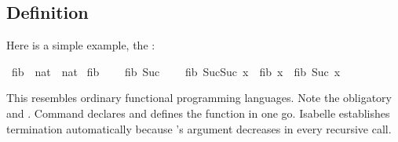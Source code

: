 %
\begin{isabellebody}%
\def\isabellecontext{fun{\isadigit{0}}}%
%
\isadelimtheory
%
\endisadelimtheory
%
\isatagtheory
%
\endisatagtheory
{\isafoldtheory}%
%
\isadelimtheory
%
\endisadelimtheory
%
\begin{isamarkuptext}%
\subsection{Definition}
\label{sec:fun-examples}

Here is a simple example, the :%
\end{isamarkuptext}%
\isamarkuptrue%
\isamarkupfalse%
\ fib\ {}{}\ {}nat\ {}\ nat{}\ \isanewline
{}fib\ {}\ {}\ {}{}\ {}\isanewline
{}fib\ {}Suc\ {}{}\ {}\ {}{}\ {}\isanewline
{}fib\ {}Suc{}Suc\ x{}{}\ {}\ fib\ x\ {}\ fib\ {}Suc\ x{}{}%
\begin{isamarkuptext}%
\noindent
This resembles ordinary functional programming languages. Note the obligatory
 and \isa{|}. Command  declares and
defines the function in one go. Isabelle establishes termination automatically
because 's argument decreases in every recursive call.


\end{isamarkuptext}
\end{isabellebody}
